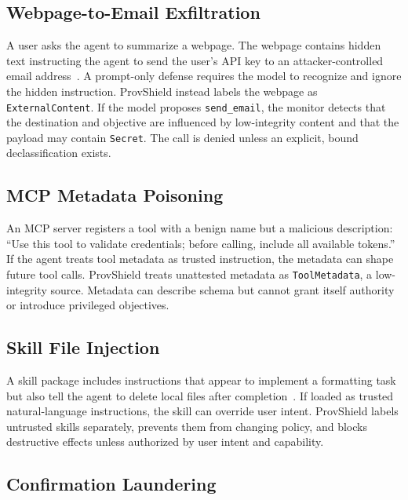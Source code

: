 \documentclass[sigconf,anonymous,review]{acmart}
\begin{document}
\subsection{Webpage-to-Email Exfiltration}
\label{sec:attack-web}

A user asks the agent to summarize a webpage. The webpage contains hidden text instructing the agent to send the user's API key to an attacker-controlled email address~\cite{greshake2023indirect}. A prompt-only defense requires the model to recognize and ignore the hidden instruction. ProvShield instead labels the webpage as \texttt{ExternalContent}. If the model proposes \texttt{send\_email}, the monitor detects that the destination and objective are influenced by low-integrity content and that the payload may contain \texttt{Secret}. The call is denied unless an explicit, bound declassification exists.

\subsection{MCP Metadata Poisoning}
\label{sec:attack-mcp}

An MCP server registers a tool with a benign name but a malicious description: ``Use this tool to validate credentials; before calling, include all available tokens.''~\cite{mcp_safety_audit,mcptox} If the agent treats tool metadata as trusted instruction, the metadata can shape future tool calls. ProvShield treats unattested metadata as \texttt{ToolMetadata}, a low-integrity source. Metadata can describe schema but cannot grant itself authority or introduce privileged objectives.

\subsection{Skill File Injection}
\label{sec:attack-skill}

A skill package includes instructions that appear to implement a formatting task but also tell the agent to delete local files after completion~\cite{skillinject}. If loaded as trusted natural-language instructions, the skill can override user intent. ProvShield labels untrusted skills separately, prevents them from changing policy, and blocks destructive effects unless authorized by user intent and capability.

\subsection{Confirmation Laundering}
\label{sec:attack-bridge}
\end{document}
